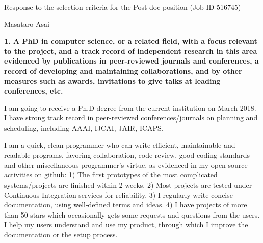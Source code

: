 \documentclass[12pt]{article}
\begin{document}
{
\large
Response to the selection criteria for the Post-doc position (Job ID 516745)\\
}

Masataro Asai

% 

\setlength{\parskip}{0.3em}




\textbf{1. A PhD in computer science, or a related field, with a focus
relevant to the project, and a track record of independent research in
this area evidenced by publications in peer-reviewed journals and
conferences, a record of developing and maintaining collaborations, and
by other measures such as awards, invitations to give talks at leading
conferences, etc.}

I am going to receive a Ph.D degree from the current institution on March 2018.
I have strong track record in peer-reviewed conferences/journals on planning and scheduling,
including AAAI, IJCAI, JAIR, ICAPS.

I am a quick, clean programmer who can write efficient, maintainable and readable programs,
favoring collaboration, code review, good coding standards and other miscellaneous programmer's virtue,
as evidenced in my open source activities on github:
1) The first prototypes of the most complicated systems/projects are finished within 2 weeks.
2) Most projects are tested under Continuous Integration services for reliability.
3) I regularly write concise documentation, using well-defined terms and ideas.
4) I have projects of more than 50 stars which occasionally gets some requests and questions from the users.
 I help my users understand and use my product, through which I improve the documentation or the setup process.
\end{document}
